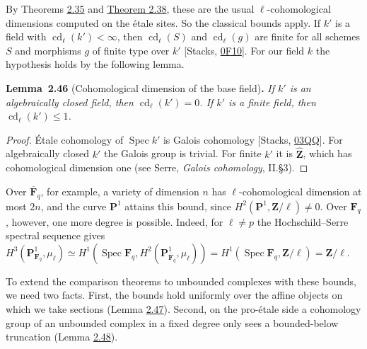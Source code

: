 \documentclass[11pt]{article}
\newenvironment{bpstatement}[2]{\par\addvspace{0.6\baselineskip}\noindent\textbf{#1}#2\textbf{.}\enspace\ignorespaces}
  {\par\addvspace{0.4\baselineskip}}
\newenvironment{bpstatementit}[2]{\begin{bpstatement}{#1}{#2}\itshape\ignorespaces}{\end{bpstatement}}
\begin{document}
\label{bp136}%
By Theorems \hyperref[bp101]{2.35} and \hyperref[bp111]{Theorem 2.38}, these are the usual \(\ell\)-cohomological dimensions computed on the étale sites. So the classical bounds apply. If \(k'\) is a field with \(\operatorname{cd}_\ell(k')<\infty\), then \(\operatorname{cd}_\ell(S)\) and \(\operatorname{cd}_\ell(g)\) are finite for all schemes \(S\) and morphisms \(g\) of finite type over \(k'\) [Stacks, \href{https://stacks.math.columbia.edu/tag/0F10}{0F10}]. For our field \(k\) the hypothesis holds by the following lemma.

\label{bp137}%
\begin{bpstatementit}{Lemma~2.46}{ (Cohomological dimension of the base field)}
If \(k'\) is an algebraically closed field, then \(\operatorname{cd}_\ell(k')=0\). If \(k'\) is a finite field, then \(\operatorname{cd}_\ell(k')\le1\).
\end{bpstatementit}

\begin{proof}[{Proof}]\label{bp138}%
Étale cohomology of \(\operatorname{Spec}k'\) is Galois cohomology [Stacks, \href{https://stacks.math.columbia.edu/tag/03QQ}{03QQ}]. For algebraically closed \(k'\) the Galois group is trivial. For finite \(k'\) it is \(\widehat{\mathbf Z}\), which has cohomological dimension one (see Serre, \emph{Galois cohomology}, II.§3).
\end{proof}

\label{bp139}%
Over \(\overline{\mathbf F}_q\), for example, a variety of dimension \(n\) has \(\ell\)-cohomological dimension at most \(2n\), and the curve \(\mathbf P^1\) attains this bound, since \(H^2(\mathbf P^1,\mathbf Z/\ell)\neq0\). Over \(\mathbf F_q\), however, one more degree is possible. Indeed, for \(\ell\neq p\) the Hochschild–Serre spectral sequence gives \(H^3(\mathbf P^1_{\mathbf F_q},\mu_\ell)\simeq
H^1(\operatorname{Spec}\mathbf F_q,H^2(\mathbf P^1_{\overline{\mathbf F}_q},\mu_\ell))
=H^1(\operatorname{Spec}\mathbf F_q,\mathbf Z/\ell)=\mathbf Z/\ell\).

To extend the comparison theorems to unbounded complexes with these bounds, we need two facts. First, the bounds hold uniformly over the affine objects on which we take sections (Lemma \hyperref[bp140]{2.47}). Second, on the pro-étale side a cohomology group of an unbounded complex in a fixed degree only sees a bounded-below truncation (Lemma \hyperref[bp142]{2.48}).
\end{document}

